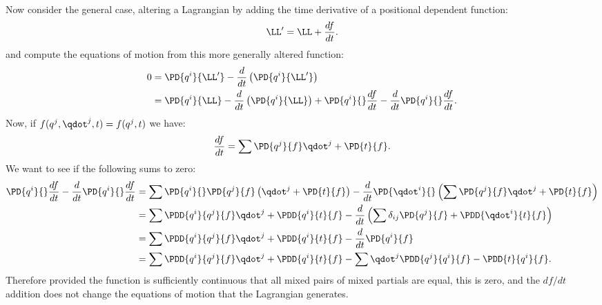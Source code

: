 {\begin{equation}
\begin{aligned}
\end{aligned}
\end{equation}
%
Now consider the general case, altering a Lagrangian by adding the time derivative of a positional dependent function:
%
\begin{equation}\label{eqn:tongMf1:1600}
\LL' = \LL + \frac{df}{dt}.
\end{equation}
%
and compute the equations of motion from this more generally altered function:
\begin{equation}\label{eqn:tongMf1:540}
\begin{aligned}
0
&= \PD{q^i}{\LL'} - \frac{d}{dt}\left(\PD{q^i}{\LL'}\right) \\
&= \PD{q^i}{\LL} - \frac{d}{dt}\left(\PD{q^i}{\LL}\right)
+ \PD{q^i}{}\frac{df}{dt} - \frac{d}{dt} \PD{q^i}{} \frac{df}{dt} .
\end{aligned}
\end{equation}
%
Now, if \(f(q^j,\qdot^j,t) = f(q^j,t)\) we have:
\begin{equation}\label{eqn:tongMf1:1620}
\frac{df}{dt} = \sum \PD{q^j}{f} \qdot^j + \PD{t}{f}.
\end{equation}
%
We want to see if the following sums to zero:
\begin{equation}\label{eqn:tongMf1:560}
\begin{aligned}
\PD{q^i}{}\frac{df}{dt} - \frac{d}{dt} \PD{q^i}{} \frac{df}{dt}
&= \sum \PD{q^i}{} \PD{q^j}{f} \left(\qdot^j + \PD{t}{f}\right) - \frac{d}{dt} \PD{\qdot^i}{} \left(\sum \PD{q^j}{f} \qdot^j + \PD{t}{f}\right) \\
&= \sum \PDD{q^i}{q^j}{f} \qdot^j + \PDD{q^i}{t}{f} - \frac{d}{dt} \left(\sum \delta_{ij} \PD{q^j}{f} + \PDD{\qdot^i}{t}{f}\right) \\
&= \sum \PDD{q^i}{q^j}{f} \qdot^j + \PDD{q^i}{t}{f} - \frac{d}{dt} \PD{q^i}{f} \\
&= \sum \PDD{q^i}{q^j}{f} \qdot^j + \PDD{q^i}{t}{f} - \sum \qdot^j \PDD{q^j}{q^i}{f} - \PDD{t}{q^i}{f} .
\end{aligned}
\end{equation}
%
Therefore provided the function is sufficiently continuous that all mixed pairs of mixed partials are equal, this is zero, and the \(df/dt\) addition does not
change the equations of motion that the Lagrangian generates.
%
}
